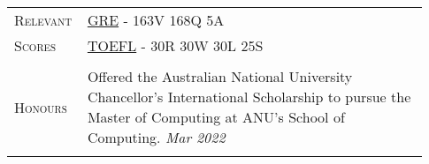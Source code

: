 \documentclass[letterpaper, 10pt, oneside]{article}
\newcommand{\stitle}[1]{\normalsize{\textsc{#1}}}
\begin{document}
\begin{longtable}{@{} p{0.13\linewidth} p{0.8\linewidth}}


    \stitle{Relevant}    & \href{https://drive.google.com/file/d/1GcdXmPTWR-6tKUgB92V8pG8GVn-ng_6C}{GRE} - 163V 168Q 5A                                                                              \\
    \stitle{Scores}      & \href{https://drive.google.com/file/d/1lHDbt59e9o1LFKb_HhWiVbzITH7avB6j}{TOEFL} - 30R 30W 30L 25S                                                                         \\
    \\


    \stitle{Honours}
                         & Offered the Australian National University Chancellor's International Scholarship to pursue the Master of Computing at ANU's School of Computing.
    \hfill \textsl{Mar 2022}                                                                                                                                                                         \\
    \\[-1ex]


\end{longtable}
\end{document}
